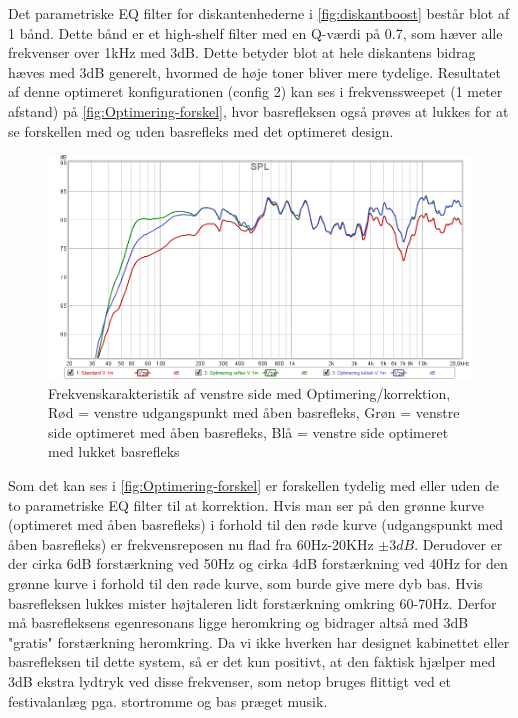 Det parametriske EQ filter for diskantenhederne i \autoref{fig:diskantboost} består blot af 1 bånd. Dette bånd er et high-shelf filter med en Q-værdi på 0.7, som hæver alle frekvenser over 1kHz med 3dB. Dette betyder blot at hele diskantens bidrag hæves med 3dB generelt, hvormed de høje toner bliver mere tydelige. Resultatet af denne optimeret konfigurationen (config 2) kan ses i frekvenssweepet (1 meter afstand) på \autoref{fig:Optimering-forskel}, hvor basrefleksen også prøves at lukkes for at se forskellen med og uden basrefleks med det optimeret design. 
\begin{figure}[H] 
	\center
	\includegraphics[width=1\linewidth]{figur/Optimering-forskel}\quad
	\caption{Frekvenskarakteristik af venstre side med Optimering/korrektion, Rød = venstre udgangspunkt med åben basrefleks, Grøn = venstre side optimeret med åben basrefleks, Blå = venstre side optimeret med lukket basrefleks}
	\label{fig:Optimering-forskel}
\end{figure}
Som det kan ses i \autoref{fig:Optimering-forskel} er forskellen tydelig med eller uden de to parametriske EQ filter til at korrektion. Hvis man ser på den grønne kurve (optimeret med åben basrefleks) i forhold til den røde kurve (udgangspunkt med åben basrefleks) er frekvensreposen nu flad fra 60Hz-20KHz $\pm3dB$. Derudover er der cirka 6dB forstærkning ved 50Hz og cirka 4dB forstærkning ved 40Hz for den grønne kurve i forhold til den røde kurve, som burde give mere dyb bas. Hvis basrefleksen lukkes mister højtaleren lidt forstærkning omkring 60-70Hz. Derfor må basrefleksens egenresonans ligge heromkring og bidrager altså med 3dB "gratis" forstærkning heromkring. Da vi ikke hverken har designet kabinettet eller basrefleksen til dette system, så er det kun positivt, at den faktisk hjælper med 3dB ekstra lydtryk ved disse frekvenser, som netop bruges flittigt ved et festivalanlæg pga. stortromme og bas præget musik.     

